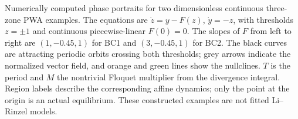 Numerically computed phase portraits for two dimensionless continuous three-zone PWA examples. The equations are $\dot z=y-F(z)$, $\dot y=-z$, with thresholds $z=\pm 1$ and continuous piecewise-linear $F(0)=0$. The slopes of $F$ from left to right are $(1,-0.45,1)$ for BC1 and $(3,-0.45,1)$ for BC2. The black curves are attracting periodic orbits crossing both thresholds; grey arrows indicate the normalized vector field, and orange and green lines show the nullclines. $T$ is the period and $M$ the nontrivial Floquet multiplier from the divergence integral. Region labels describe the corresponding affine dynamics; only the point at the origin is an actual equilibrium. These constructed examples are not fitted Li--Rinzel models.

